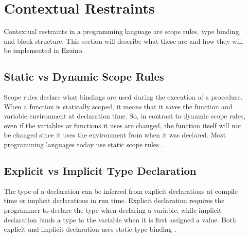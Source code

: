 \section{Contextual Restraints}
Contextual restraints in a programming language are scope rules, type binding, and block structure. This section will describe what these are and how they will be implemented in Ezuino.
\subsection{Static vs Dynamic Scope Rules}
Scope rules declare what bindings are used during the execution of a procedure.
When a function is statically scoped, it means that it saves the function and variable environment at declaration time. So, in contrast to dynamic scope rules, even if the variables or functions it uses are changed, the function itself will not be changed since it uses the environment from when it was declared. Most programming languages today use static scope rules \cite{syntax-and-semantics}. %
\subsection{Explicit vs Implicit Type Declaration}
The type of a declaration can be inferred from explicit declarations at compile time or implicit declarations in run time. Explicit declaration requires the programmer to declare the type when declaring a variable, while implicit declaration binds a type to the variable when it is first assigned a value. Both explicit and implicit declaration uses static type binding \cite{conceptsOfProgrammingLanguages}.

